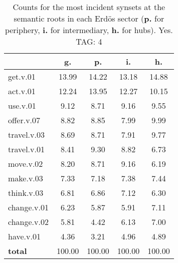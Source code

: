 \begin{table}[h!]
\begin{center}
\begin{tabular}{| l | c | c | c | c |}\hline
 & g. & p. & i. & h. \\\hline
get.v.01 & 13.99  & 14.22  & 13.18  & 14.88 \\\hline
act.v.01 & 12.24  & 13.95  & 12.27  & 10.15 \\\hline
use.v.01 & 9.12  & 8.71  & 9.16  & 9.55 \\\hline
offer.v.07 & 8.82  & 8.85  & 7.99  & 9.99 \\\hline
travel.v.03 & 8.69  & 8.71  & 7.91  & 9.77 \\\hline
travel.v.01 & 8.41  & 9.30  & 8.82  & 6.73 \\\hline
move.v.02 & 8.20  & 8.71  & 9.16  & 6.19 \\\hline
make.v.03 & 7.33  & 7.18  & 7.38  & 7.44 \\\hline
think.v.03 & 6.81  & 6.86  & 7.12  & 6.30 \\\hline
change.v.01 & 6.23  & 5.87  & 5.91  & 7.11 \\\hline
change.v.02 & 5.81  & 4.42  & 6.13  & 7.00 \\\hline
have.v.01 & 4.36  & 3.21  & 4.96  & 4.89 \\\hline
{{\bf total}} & 100.00  & 100.00  & 100.00  & 100.00 \\\hline
\end{tabular}
\caption{Counts for the most incident synsets at the semantic roots in each Erd\"os sector ({\bf p.} for periphery, {\bf i.} for intermediary, {\bf h.} for hubs). Yes. TAG: 4}
\end{center}
\end{table}
